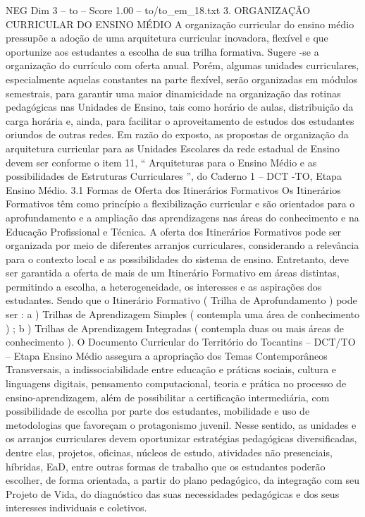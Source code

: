 \begin{textsample}{NEG Dim 3 – to – Score 1.00 – to/to\_em\_18.txt}  \label{ex:f3_neg_183}
3.
ORGANIZAÇÃO CURRICULAR DO ENSINO MÉDIO A organização curricular do ensino médio pressupõe a adoção de uma arquitetura curricular inovadora, flexível e que oportunize aos estudantes a escolha de sua trilha formativa.
Sugere -se a organização do currículo com oferta anual.
Porém, algumas unidades curriculares, especialmente aquelas constantes na parte flexível, serão organizadas em módulos semestrais, para garantir uma maior dinamicidade na organização das rotinas pedagógicas nas Unidades de Ensino, tais como horário de aulas, distribuição da carga horária e, ainda, para facilitar o aproveitamento de estudos dos estudantes oriundos de outras redes.
Em razão do exposto, as propostas de organização da arquitetura curricular para as Unidades Escolares da rede estadual de Ensino devem ser conforme o item 11, “ Arquiteturas para o Ensino Médio e as possibilidades de Estruturas Curriculares ”, do Caderno 1 – DCT -TO, Etapa Ensino Médio. 3.1 Formas de Oferta dos Itinerários Formativos Os Itinerários Formativos têm como princípio a flexibilização curricular e são orientados para o aprofundamento e a ampliação das aprendizagens nas áreas do conhecimento e na Educação Profissional e Técnica.
A oferta dos Itinerários Formativos pode ser organizada por meio de diferentes arranjos curriculares, considerando a relevância para o contexto local e as possibilidades do sistema de ensino.
Entretanto, deve ser garantida a oferta de mais de um Itinerário Formativo em áreas distintas, permitindo a escolha, a heterogeneidade, os interesses e as aspirações dos estudantes.
Sendo que o Itinerário Formativo ( Trilha de Aprofundamento ) pode ser : a ) Trilhas de Aprendizagem Simples ( contempla uma área de conhecimento ) ; b ) Trilhas de Aprendizagem Integradas ( contempla duas ou mais áreas de conhecimento ).
O Documento Curricular do Território do Tocantins – DCT/TO – Etapa Ensino Médio assegura a apropriação dos Temas Contemporâneos Transversais, a indissociabilidade entre educação e práticas sociais, cultura e linguagens digitais, pensamento computacional, teoria e prática no processo de ensino-aprendizagem, além de possibilitar a certificação intermediária, com possibilidade de escolha por parte dos estudantes, mobilidade e uso de metodologias que favoreçam o protagonismo juvenil.
Nesse sentido, as unidades e os arranjos curriculares devem oportunizar estratégias pedagógicas diversificadas, dentre elas, projetos, oficinas, núcleos de estudo, atividades não presenciais, híbridas, EaD, entre outras formas de trabalho que os estudantes poderão escolher, de forma orientada, a partir do plano pedagógico, da integração com seu Projeto de Vida, do diagnóstico das suas necessidades pedagógicas e dos seus interesses individuais e coletivos.

\end{textsample}
